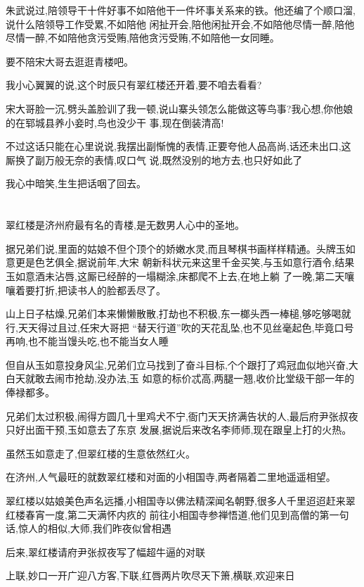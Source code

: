 ﻿\documentclass[12pt]{article}
\begin{document}
朱武说过,陪领导干十件好事不如陪他干一件坏事关系来的铁。他还编了个顺口溜,说什么陪领导工作受累,不如陪他
闲扯开会,陪他闲扯开会,不如陪他尽情一醉,陪他尽情一醉,不如陪他贪污受贿,陪他贪污受贿,不如陪他一女同睡。

要不陪宋大哥去逛逛青楼吧。

我小心翼翼的说,这个时辰只有翠红楼还开着,要不咱去看看?

宋大哥脸一沉,劈头盖脸训了我一顿,说山寨头领怎么能做这等鸟事?我心想,你他娘的在郓城县养小妾时,鸟也没少干
事,现在倒装清高!

不过这话只能在心里说说,我摆出副惭愧的表情,正要夸他人品高尚,话还未出口,这厮换了副万般无奈的表情,叹口气
说,既然没别的地方去,也只好如此了

我心中暗笑,生生把话咽了回去。

\section{}

翠红楼是济州府最有名的青楼,是无数男人心中的圣地。

据兄弟们说,里面的姑娘不但个顶个的娇嫩水灵,而且琴棋书画样样精通。头牌玉如意更是色艺俱全,据说前年,大宋
朝新科状元来这里千金买笑,与玉如意行酒令,结果玉如意酒未沾唇,这厮已经醉的一塌糊涂,床都爬不上去,在地上躺
了一晚,第二天嚷嚷着要打折,把读书人的脸都丢尽了。

山上日子枯燥,兄弟们本来懒懒散散,打劫也不积极,东一榔头西一棒槌,够吃够喝就行,天天得过且过,任宋大哥把
``替天行道''吹的天花乱坠,也不见丝毫起色,毕竟口号再响,也不能当馒头吃,也不能当女人睡

但自从玉如意投身风尘,兄弟们立马找到了奋斗目标,个个跟打了鸡冠血似地兴奋,大白天就敢去闹市抢劫,没办法,玉
如意的标价忒高,两腿一翘,收价比堂级干部一年的俸禄都多。

兄弟们太过积极,闹得方圆几十里鸡犬不宁,衙门天天挤满告状的人,最后府尹张叔夜只好出面干预,玉如意去了东京
发展,据说后来改名李师师,现在跟皇上打的火热。

虽然玉如意走了,但翠红楼的生意依然红火。

在济州,人气最旺的就数翠红楼和对面的小相国寺,两者隔着二里地遥遥相望。

翠红楼以姑娘美色声名远播,小相国寺以佛法精深闻名朝野,很多人千里迢迢赶来翠红楼春宵一度,第二天满怀内疚的
前往小相国寺参禅悟道,他们见到高僧的第一句话,惊人的相似,大师,我们昨夜似曾相遇

后来,翠红楼请府尹张叔夜写了幅超牛逼的对联

上联,妙口一开广迎八方客,下联,红唇两片吹尽天下箫,横联,欢迎来日
\end{document}
